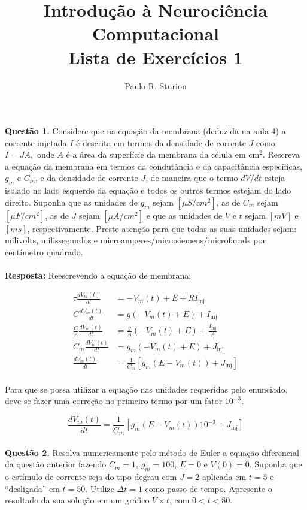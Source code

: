 \documentclass[portuguese,12pt,a4paper]{article}
\title{Introdução à Neurociência Computacional\\Lista de Exercícios 1}
\author{Paulo R. Sturion}
\begin{document}
	\maketitle
	
	\noindent\textbf{Questão 1.} Considere que na equação da membrana (deduzida na aula 4) a corrente injetada 
	$I$ é descrita em termos da densidade de corrente $J$ como 
	$I = JA,$
	onde $A$ é a área da superfície da membrana da célula em cm$^2$. 
	Rescreva a equação da membrana em termos da condutância e da capacitância específicas, $g_m$ e $C_m$, 
	e da densidade de corrente $J$, de maneira que o termo $dV/dt$ esteja isolado no lado esquerdo da equação 
	e todos os outros termos estejam do lado direito. Suponha que as unidades de $g_m$ sejam $[\mu S/cm^2]$, as de $C_m$ sejam $[\mu F/cm^2]$, 
	as de $J$ sejam $[\mu A/cm^2]$ e que as unidades de $V$ e $t$ sejam $[mV]$ e $[ms]$, respectivamente. 
	Preste atenção para que todas as suas unidades sejam: milivolts, milissegundos e microamperes/microsiemens/microfarads 
	por centímetro quadrado.
	\\\\
	
	\noindent\textbf{Resposta:} Reescrevendo a equação de membrana:
	
	\begin{align*}
		\tau \frac{dV_m(t)}{dt} &= -V_m(t) + E + R I_{\text{inj}} \\
		C \frac{dV_m(t)}{dt} &= g(-V_m(t) + E) + I_{\text{inj}} \\
		\frac{C}{A} \frac{dV_m(t)}{dt} &= \frac{g}{A}(-V_m(t) + E) + \frac{I_{\text{inj}}}{A} \\
		C_m \frac{dV_m(t)}{dt} &= g_m(-V_m(t) + E) + J_{\text{inj}} \\
		\frac{dV_m(t)}{dt} &= \frac{1}{C_m}[g_m(E - V_m(t)) + J_{\text{inj}}]
	\end{align*}\\
	
	Para que se possa  utilizar a equação nas unidades requeridas pelo enunciado, deve-se fazer uma correção no primeiro termo por um fator $10^{-3}$.
	
	$$\frac{dV_m(t)}{dt} = \frac{1}{C_m}[g_m(E - V_m(t))10^{-3} + J_{\text{inj}}]$$\\
	
	\noindent \textbf{Questão 2.} Resolva numericamente pelo método de Euler a equação diferencial da questão anterior fazendo $C_m = 1$, $g_m = 100$, $E = 0$ e $V(0) = 0$. Suponha que o estímulo de corrente seja do tipo degrau com $J = 2$ aplicada em $t = 5$ e ``desligada'' em $t = 50$. Utilize $\Delta t = 1$ como passo de tempo. Apresente o resultado da sua solução em um gráfico $V \times t$, com $0 < t < 80$.\\\\
	
\end{document}
